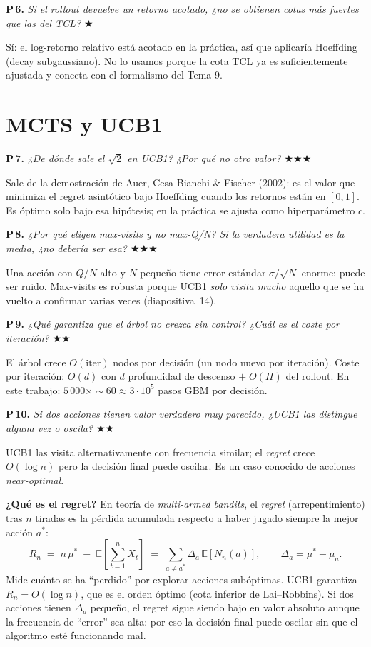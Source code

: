 \documentclass[11pt,a4paper]{article}
\newcommand{\preg}[2]{%
  \par\medskip
  \noindent\textbf{P\,#1.} \emph{#2}\par\smallskip}
\newcommand{\resp}[1]{%
  \noindent #1\par}
\begin{document}
\preg{6}{Si el rollout devuelve un retorno acotado, ¿no se obtienen cotas
más fuertes que las del TCL? \hfill$\bigstar$}
\resp{%
Sí: el log-retorno relativo está acotado en la práctica, así que aplicaría
Hoeffding (decay subgaussiano). No lo usamos porque la cota TCL ya es
suficientemente ajustada y conecta con el formalismo del Tema 9.}

\section{MCTS y UCB1}

\preg{7}{¿De dónde sale el $\sqrt{2}$ en UCB1? ¿Por qué no otro valor?
\hfill$\bigstar\bigstar\bigstar$}
\resp{%
Sale de la demostración de Auer, Cesa-Bianchi \& Fischer (2002): es el valor
que minimiza el regret asintótico bajo Hoeffding cuando los retornos están
en $[0,1]$. Es óptimo solo bajo esa hipótesis; en la práctica se ajusta
como hiperparámetro $c$.}

\preg{8}{¿Por qué eligen \emph{max-visits} y no \emph{max-Q/N}? Si la
verdadera utilidad es la media, ¿no debería ser esa?
\hfill$\bigstar\bigstar\bigstar$}
\resp{%
Una acción con $Q/N$ alto y $N$ pequeño tiene error estándar $\sigma/\sqrt N$
enorme: puede ser ruido. Max-visits es robusta porque UCB1 \emph{solo
visita mucho} aquello que se ha vuelto a confirmar varias veces
(diapositiva~14).}

\preg{9}{¿Qué garantiza que el árbol no crezca sin control? ¿Cuál es el
coste por iteración? \hfill$\bigstar\bigstar$}
\resp{%
El árbol crece $O(\text{iter})$ nodos por decisión (un nodo nuevo por
iteración). Coste por iteración: $O(d)$ con $d$ profundidad de descenso
$+\;O(H)$ del rollout. En este trabajo: $5\,000\times{\sim}60\approx
3\cdot 10^5$ pasos GBM por decisión.}

\preg{10}{Si dos acciones tienen valor verdadero muy parecido, ¿UCB1 las
distingue alguna vez o oscila? \hfill$\bigstar\bigstar$}
\resp{%
UCB1 las visita alternativamente con frecuencia similar; el \emph{regret}
crece $O(\log n)$ pero la decisión final puede oscilar. Es un caso conocido
de acciones \emph{near-optimal}.

\smallskip
\noindent\textbf{¿Qué es el regret?} En teoría de \emph{multi-armed bandits},
el \emph{regret} (arrepentimiento) tras $n$ tiradas es la pérdida acumulada
respecto a haber jugado siempre la mejor acción $a^*$:
\[
  R_n \;=\; n\,\mu^* \;-\; \mathbb{E}\!\left[\sum_{t=1}^{n} X_t\right]
       \;=\; \sum_{a\neq a^*}\!\Delta_a\,\mathbb{E}[N_n(a)],
  \qquad \Delta_a = \mu^* - \mu_a.
\]
Mide cuánto se ha ``perdido'' por explorar acciones subóptimas. UCB1
garantiza $R_n = O(\log n)$, que es el orden óptimo (cota inferior de
Lai--Robbins). Si dos acciones tienen $\Delta_a$ pequeño, el regret sigue
siendo bajo en valor absoluto aunque la frecuencia de ``error'' sea alta:
por eso la decisión final puede oscilar sin que el algoritmo esté
funcionando mal.}
\end{document}

